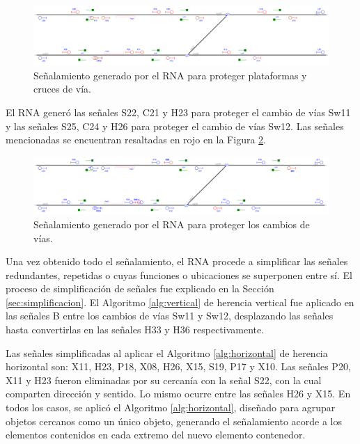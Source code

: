 	\begin{figure}[H]
		\centering
		\includegraphics[width=1\textwidth]{resultados-obtenidos/ejemplo8/images/8_step3.png}
		\centering\caption{Señalamiento generado por el RNA para proteger plataformas y cruces de vía.}
		\label{fig:EJ8_5}
	\end{figure}
	
	El RNA generó las señales S22, C21 y H23 para proteger el cambio de vías Sw11 y las señales S25, C24 y H26 para proteger el cambio de vías Sw12. Las señales mencionadas se encuentran resaltadas en rojo en la Figura \ref{fig:EJ8_6}.
	
	\begin{figure}[H]
		\centering
		\includegraphics[width=1\textwidth]{resultados-obtenidos/ejemplo8/images/8_step4.png}
		\centering\caption{Señalamiento generado por el RNA para proteger los cambios de vías.}
		\label{fig:EJ8_6}
	\end{figure}
	
	Una vez obtenido todo el señalamiento, el RNA procede a simplificar las señales redundantes, repetidas o cuyas funciones o ubicaciones se superponen entre sí. El proceso de simplificación de señales fue explicado en la Sección \ref{sec:simplificacion}. El Algoritmo \ref{alg:vertical} de herencia vertical fue aplicado en las señales B entre los cambios de vías Sw11 y Sw12, desplazando las señales hasta convertirlas en las señales H33 y H36 respectivamente.
	
	Las señales simplificadas al aplicar el Algoritmo \ref{alg:horizontal} de herencia horizontal son: X11, H23, P18, X08, H26, X15, S19, P17 y X10. Las señales P20, X11 y H23 fueron eliminadas por su cercanía con la señal S22, con la cual comparten dirección y sentido. Lo mismo ocurre entre las señales H26 y X15. En todos los casos, se aplicó el Algoritmo \ref{alg:horizontal}, diseñado para agrupar objetos cercanos como un único objeto, generando el señalamiento acorde a los elementos contenidos en cada extremo del nuevo elemento contenedor.
	
